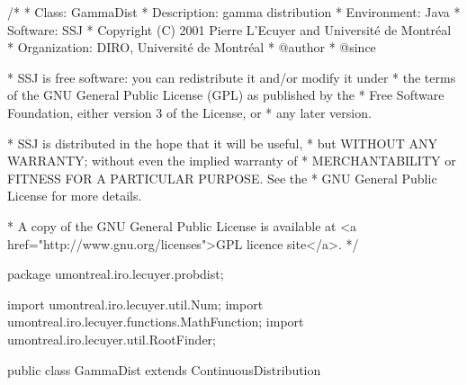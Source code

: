 \begin{code}
\begin{hide}
/*
 * Class:        GammaDist
 * Description:  gamma distribution
 * Environment:  Java
 * Software:     SSJ 
 * Copyright (C) 2001  Pierre L'Ecuyer and Université de Montréal
 * Organization: DIRO, Université de Montréal
 * @author       
 * @since

 * SSJ is free software: you can redistribute it and/or modify it under
 * the terms of the GNU General Public License (GPL) as published by the
 * Free Software Foundation, either version 3 of the License, or
 * any later version.

 * SSJ is distributed in the hope that it will be useful,
 * but WITHOUT ANY WARRANTY; without even the implied warranty of
 * MERCHANTABILITY or FITNESS FOR A PARTICULAR PURPOSE.  See the
 * GNU General Public License for more details.

 * A copy of the GNU General Public License is available at
   <a href="http://www.gnu.org/licenses">GPL licence site</a>.
 */
\end{hide}
package umontreal.iro.lecuyer.probdist;
\begin{hide}
import umontreal.iro.lecuyer.util.Num;
import umontreal.iro.lecuyer.functions.MathFunction;
import umontreal.iro.lecuyer.util.RootFinder;
\end{hide}

public class GammaDist extends ContinuousDistribution\begin{hide} {
   private double alpha;
   private double lambda;
   private double logFactor;      // Log (lambda^alpha / Gamma (alpha))
   private static final double ALIM = 1.0E5;

   private static class Function implements MathFunction {
      // For MLE
      private int n;
      private double empiricalMean;
      private double sumLn;

      public Function (int n, double empiricalMean, double sumLn) {
         this.n = n;
         this.empiricalMean = empiricalMean;
         this.sumLn = sumLn;
      }

      public double evaluate (double x) {
         if (x <= 0.0) return 1.0e200;
         return (n * Math.log (empiricalMean / x) + n * Num.digamma (x) - sumLn);
      }
   }


   private static class myFunc implements MathFunction {
      // For inverseF
      protected int d;
      protected double alp, u;

      public myFunc (double alp, int d, double u) {
         this.alp = alp;
         this.d = d;
         this.u = u;
      }

      public double evaluate (double x) {
         return u - GammaDist.cdf(alp, d, x);
      }
   }


\end{hide}\end{code}
